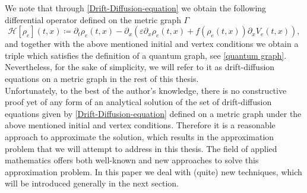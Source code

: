 We note that through \cref{Drift-Diffusion-equation} we obtain the following differential operator defined on the metric graph $\Gamma$
\begin{equation} 
    \label{eq:Hamiltonian}
    \mathcal{H} [\rho_e]  \left( t,x \right)  \coloneqq \partial_t \rho_e  \left( t,x \right)   - \partial_x  \left( \varepsilon \partial_x \rho_e  \left( t,x \right)  + f \left( \rho_e  \left( t,x \right)   \right)  \partial_x V_e  \left( t,x \right)  \right) ,
\end{equation}
and together with the above mentioned initial and vertex conditions we obtain a triple which satisfies the definition of a quantum graph, see \cref{quantum graph}. Nevertheless, for the sake of simplicity, we will refer to it as drift-diffusion equations on a metric graph in the rest of this thesis. \\
Unfortunately, to the best of the author's knowledge, there is no constructive proof yet of any form of an analytical solution of the set of drift-diffusion equations given by \cref{Drift-Diffusion-equation} defined on a metric graph under the above mentioned initial and vertex conditions. Therefore it is a reasonable approach to approximate the solution, which results in the approximation problem that we will attempt to address in this thesis. The field of applied mathematics offers both well-known and new approaches to solve this approximation problem. In this paper we deal with (quite) new techniques, which will be introduced generally in the next section. 




